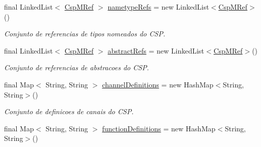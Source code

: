 \begin{DoxyCompactItemize}
final Linked\+List$<$ \hyperlink{classcom_1_1fware_1_1cspdt_1_1cspm_1_1core_1_1model_1_1_csp_m_ref}{Csp\+M\+Ref} $>$ \hyperlink{classcom_1_1fware_1_1cspdt_1_1cspm_1_1core_1_1model_1_1_csp_m_model_a56e20f5eedda41f95187c8b81506b7a5}{nametype\+Refs} = new Linked\+List$<$\hyperlink{classcom_1_1fware_1_1cspdt_1_1cspm_1_1core_1_1model_1_1_csp_m_ref}{Csp\+M\+Ref}$>$()
\begin{DoxyCompactList}\small\item\em Conjunto de referencias de tipos nomeados do C\+SP. \end{DoxyCompactList}\item 
\mbox{\label{classcom_1_1fware_1_1cspdt_1_1cspm_1_1core_1_1model_1_1_csp_m_model_a475286ab7d66ee1906b991fcbef7931a}} 
final Linked\+List$<$ \hyperlink{classcom_1_1fware_1_1cspdt_1_1cspm_1_1core_1_1model_1_1_csp_m_ref}{Csp\+M\+Ref} $>$ \hyperlink{classcom_1_1fware_1_1cspdt_1_1cspm_1_1core_1_1model_1_1_csp_m_model_a475286ab7d66ee1906b991fcbef7931a}{abstract\+Refs} = new Linked\+List$<$\hyperlink{classcom_1_1fware_1_1cspdt_1_1cspm_1_1core_1_1model_1_1_csp_m_ref}{Csp\+M\+Ref}$>$()
\begin{DoxyCompactList}\small\item\em Conjunto de referencias de abstracoes do C\+SP. \end{DoxyCompactList}\item 
\mbox{\label{classcom_1_1fware_1_1cspdt_1_1cspm_1_1core_1_1model_1_1_csp_m_model_ab7a908078c826ce8442303ff57b6fc69}} 
final Map$<$ String, String $>$ \hyperlink{classcom_1_1fware_1_1cspdt_1_1cspm_1_1core_1_1model_1_1_csp_m_model_ab7a908078c826ce8442303ff57b6fc69}{channel\+Definitions} = new Hash\+Map$<$String, String$>$()
\begin{DoxyCompactList}\small\item\em Conjunto de definicoes de canais do C\+SP. \end{DoxyCompactList}\item 
\mbox{\label{classcom_1_1fware_1_1cspdt_1_1cspm_1_1core_1_1model_1_1_csp_m_model_ab8fd2eeabc86c739674447223495266b}} 
final Map$<$ String, String $>$ \hyperlink{classcom_1_1fware_1_1cspdt_1_1cspm_1_1core_1_1model_1_1_csp_m_model_ab8fd2eeabc86c739674447223495266b}{function\+Definitions} = new Hash\+Map$<$String, String$>$()

\end{DoxyCompactItemize}
